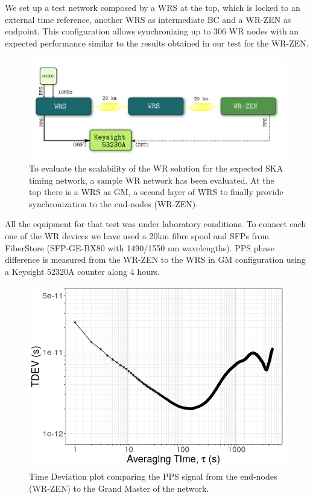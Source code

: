 We set up a test network composed by a WRS at the top, which is locked to an 
external time reference, another WRS as intermediate BC and a WR-ZEN as 
endpoint. This configuration allows synchronizing up to 306 WR nodes with an 
expected performance similar to the results obtained in our test for the WR-ZEN.

\begin{figure}
	\centering
	\includegraphics[width=0.7\linewidth]{img/prueba_red}
	\caption[WR Scalability test's setup for SKA]{To evaluate the scalability 
	of the WR solution for the expected SKA timing network, a sample WR 
	network has been evaluated. At the top there is a WRS as GM, a second layer 
	of WRS to finally provide synchronization to the end-nodes (WR-ZEN).}
	\label{fig:pruebared}
\end{figure}


All the equipment for that test was under laboratory conditions. To connect 
each one of the WR devices we have used a 20km fibre spool and SFPs from 
FiberStore (SFP-GE-BX80 with 1490/1550 nm wavelengths). PPS phase difference is 
measured from the WR-ZEN to the WRS in GM configuration using a Keysight 52320A 
counter along 4 hours.

\begin{figure}
	\centering
	\includegraphics[width=0.7\linewidth]{img/tdev_exp3}
	\caption[TDEV of the end-nodes in the scalability test.]{Time Deviation 
	plot comparing the PPS signal from the end-nodes (WR-ZEN) to the Grand 
	Master of the network.}
	\label{fig:tdevnet}
\end{figure}

